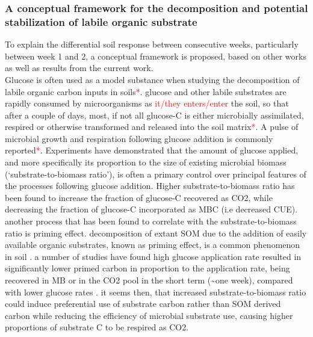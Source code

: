 \documentclass[12pt]{report}
\newcommand{\myRed}[1]{\textcolor{red}{#1}} %
\begin{document}
		\subsubsection{A conceptual framework for the decomposition and potential stabilization of labile organic substrate}
			To explain the differential soil response between consecutive weeks, particularly between week 1 and 2, a conceptual framework is proposed, based on other works as well as results from the current work.\\
			Glucose is often used as a model substance when studying the decomposition of labile organic carbon inputs in soils\citep{kuzyakov2010}\myRed{*}.
			glucose and other labile substrates are rapidly consumed by microorganisms as \myRed{it/they enters/enter} the soil, so that after a couple of days, most, if not all glucose-C is either microbially assimilated, respired or otherwise transformed and released into the soil matrix\myRed{*}. A pulse of microbial growth and respiration following glucose addition is commonly reported\myRed{*}. 
			Experiments have demonstrated that the amount of glucose applied, and more specifically its proportion to the size of existing microbial biomass (‘substrate-to-biomass ratio’), is often a primary control over principal features of the processes following  glucose addition. Higher substrate-to-biomass ratio has been found to increase the fraction of glucose-C recovered as CO2, while decreasing the fraction of glucose-C incorporated as MBC (i.e decreased CUE)\citep{schneckenberger2008, tian2015}.
			another process that has been found to correlate with the substrate-to-biomass ratio is priming effect. decomposition of extant SOM due to the addition of easily available organic substrates, known as priming effect, is a common phenomenon in soil \citep{kuzyakov2010}. a number of studies have found  high glucose application rate resulted in significantly lower primed carbon in proportion to the application rate, being recovered in MB or in the  CO2 pool in the short term (\~{}one week), compared with lower glucose rates \citep{blagodatskaya2011, schneckenberger2008, wu1993}.
			it seems then, that increased substrate-to-biomass ratio could induce preferential use of substrate carbon rather than SOM derived carbon while reducing the efficiency of microbial substrate use, causing higher proportions of substrate C to be respired as CO2. 
\end{document}
